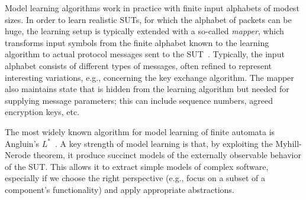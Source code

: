 \documentclass[11pt]{article}
\begin{document}

Model learning algorithms work in practice with finite input alphabets of modest sizes. In order to learn realistic SUTs, for which the alphabet of packets can be huge, the learning setup is typically extended with
a so-called \emph{mapper}, which
transforms input symbols from the finite alphabet known to the learning algorithm to actual protocol
messages sent to the SUT~\cite{AJUV15}.
Typically, the input alphabet consists of different types of messages, often
refined to represent interesting variations, e.g., concerning the key exchange algorithm.
The mapper also maintains state that is hidden from the
learning algorithm but needed for supplying message parameters; this can include sequence numbers, agreed encryption keys, etc.

The most widely known algorithm for model learning of finite automata 
is Angluin's $L^*$~\cite{Angluin1987}.
A key strength of model learning is that, by exploiting the Myhill-Nerode
theorem, it produce succinct models of the externally observable behavior of
the SUT.
%
This allows it to extract simple models of complex software, especially if
we choose the right perspective (e.g., focus on a subset of a component's
functionality) and apply appropriate abstractions.
\end{document}
